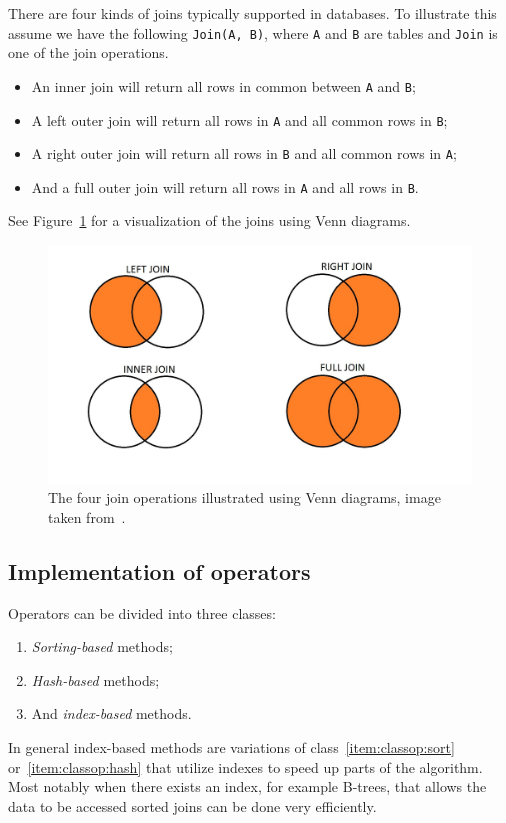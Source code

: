 There are four kinds of joins typically supported in databases. To illustrate
this assume we have the following \texttt{Join(A, B)}, where \texttt{A} and
\texttt{B} are tables and \texttt{Join} is one of the join operations.
\begin{itemize}
\item An inner join will return all rows in common between \texttt{A} and
  \texttt{B};
\item A left outer join will return all rows in \texttt{A} and all common rows
  in \texttt{B};
\item A right outer join will return all rows in \texttt{B} and all common rows
  in \texttt{A};
\item And a full outer join will return all rows in \texttt{A} and all rows in
  \texttt{B}.
\end{itemize}
See Figure~\ref{fig:vennjoin} for a visualization of the joins using Venn
diagrams.

\begin{figure}[ht]
  \includegraphics[scale=0.4]{Images/SQL-Join-Venn-Diagrams.jpg}
  \caption[Illustration of join operations using Venn diagrams]{The four join
    operations illustrated using Venn diagrams, image taken
    from~\cite{brian_2014_better_bqj}.}\label{fig:vennjoin}
\end{figure}

\subsection{Implementation of operators}\label{sec:opimpl}

Operators can be divided into three classes:
\begin{enumerate}
\item\label{item:classop:sort} \textit{Sorting-based} methods;
\item\label{item:classop:hash} \textit{Hash-based} methods;
\item\label{item:classop:index} And \textit{index-based} methods.
\end{enumerate}
In general index-based methods are variations of class~\ref{item:classop:sort}
or~\ref{item:classop:hash} that utilize indexes to speed up parts of the
algorithm. Most notably when there exists an index, for example B-trees, that
allows the data to be accessed sorted joins can be done very efficiently.

